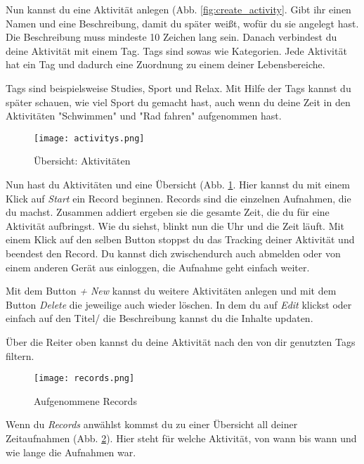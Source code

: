 Nun kannst du eine Aktivität anlegen (Abb. \ref{fig:create_activity}. 
Gibt ihr einen Namen und eine Beschreibung, damit du später weißt, wofür du sie angelegt hast. 
Die Beschreibung muss mindeste 10 Zeichen lang sein. 
Danach verbindest du deine Aktivität mit einem Tag. Tags sind sowas wie Kategorien. 
Jede Aktivität hat ein Tag und dadurch eine Zuordnung zu einem deiner Lebensbereiche. 

Tags sind beispielsweise Studies, Sport und Relax. 
Mit Hilfe der Tags kannst du später schauen, wie viel Sport du gemacht hast, auch wenn du deine Zeit in den Aktivitäten "Schwimmen" und "Rad fahren" aufgenommen hast. 


\begin{figure}[H]
	\hspace{-1.5cm}
	\centering
	\texttt{[image: activitys.png]}
	\caption{Übersicht: Aktivitäten}
	\label{fig:activitys}
\end{figure}

Nun hast du Aktivitäten und eine Übersicht (Abb. \ref{fig:activitys}. Hier kannst du mit einem Klick auf  \textit{Start}  ein Record beginnen. Records sind die einzelnen Aufnahmen, die du machst. Zusammen addiert ergeben sie die gesamte Zeit, die du für eine Aktivität aufbringst. Wie du siehst, blinkt nun die Uhr und die Zeit läuft. 
Mit einem Klick auf den selben Button stoppst du das Tracking deiner Aktivität und beendest den Record. Du kannst dich zwischendurch auch abmelden oder von einem anderen Gerät aus einloggen, die Aufnahme geht einfach weiter. 

Mit dem Button \textit{+ New} kannst du weitere Aktivitäten anlegen und mit dem Button \textit{Delete} die jeweilige auch wieder löschen. In dem du auf \textit{Edit} klickst oder einfach auf den Titel/ die Beschreibung kannst du die Inhalte updaten. 

Über die Reiter oben kannst du deine Aktivität nach den von dir genutzten Tags filtern. 

\begin{figure}[H]
	\hspace{-1.5cm}
	\centering
	\texttt{[image: records.png]}
	\caption{Aufgenommene Records}
	\label{fig:records}
\end{figure}

Wenn du \textit{Records} anwählst kommst du zu einer Übersicht all deiner Zeitaufnahmen (Abb. \ref{fig:records}). Hier steht für welche Aktivität, von wann bis wann und wie lange die Aufnahmen war. 

